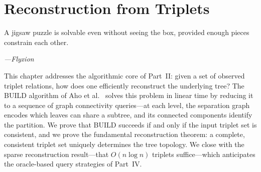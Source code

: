 \chapter{Reconstruction from Triplets}
\label{ch:reconstruction}

\epigraph{%
  A jigsaw puzzle is solvable even without seeing the box,
  provided enough pieces constrain each other.%
}{\textit{---Flyxion}}

This chapter addresses the algorithmic core of Part~II: given a set of observed triplet relations, how does one efficiently reconstruct the underlying tree? The BUILD algorithm of Aho et al.~\cite{Aho1981} solves this problem in linear time by reducing it to a sequence of graph connectivity queries---at each level, the separation graph encodes which leaves can share a subtree, and its connected components identify the partition. We prove that BUILD succeeds if and only if the input triplet set is consistent, and we prove the fundamental reconstruction theorem: a complete, consistent triplet set uniquely determines the tree topology. We close with the sparse reconstruction result---that $O(n\log n)$ triplets suffice---which anticipates the oracle-based query strategies of Part~IV.

